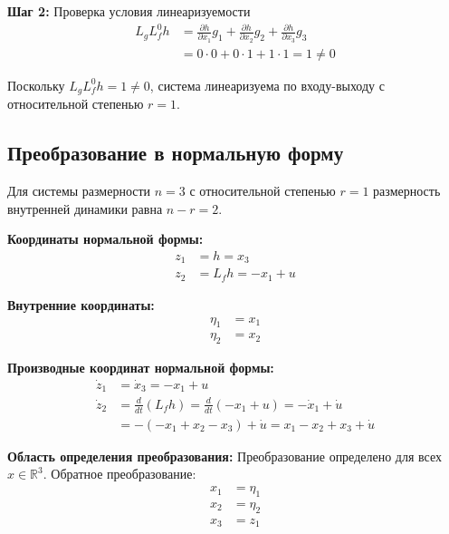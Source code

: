 \textbf{Шаг 2:} Проверка условия линеаризуемости
\begin{align}
L_g L_f^0 h &= \frac{\partial h}{\partial x_1} g_1 + \frac{\partial h}{\partial x_2} g_2 + \frac{\partial h}{\partial x_3} g_3 \\
&= 0 \cdot 0 + 0 \cdot 1 + 1 \cdot 1 = 1 \neq 0
\end{align}

Поскольку $L_g L_f^0 h = 1 \neq 0$, система линеаризуема по входу-выходу с относительной степенью $r = 1$.

\subsection*{Преобразование в нормальную форму}

Для системы размерности $n = 3$ с относительной степенью $r = 1$ размерность внутренней динамики равна $n - r = 2$.

\textbf{Координаты нормальной формы:}
\begin{align}
z_1 &= h = x_3 \\
z_2 &= L_f h = -x_1 + u
\end{align}

\textbf{Внутренние координаты:}
\begin{align}
\eta_1 &= x_1 \\
\eta_2 &= x_2
\end{align}

\textbf{Производные координат нормальной формы:}
\begin{align}
\dot{z}_1 &= \dot{x}_3 = -x_1 + u \\
\dot{z}_2 &= \frac{d}{dt}(L_f h) = \frac{d}{dt}(-x_1 + u) = -\dot{x}_1 + \dot{u} \\
&= -(-x_1 + x_2 - x_3) + \dot{u} = x_1 - x_2 + x_3 + \dot{u}
\end{align}

\textbf{Область определения преобразования:}
Преобразование определено для всех $x \in \mathbb{R}^3$. Обратное преобразование:
\begin{align}
x_1 &= \eta_1 \\
x_2 &= \eta_2 \\
x_3 &= z_1
\end{align}

